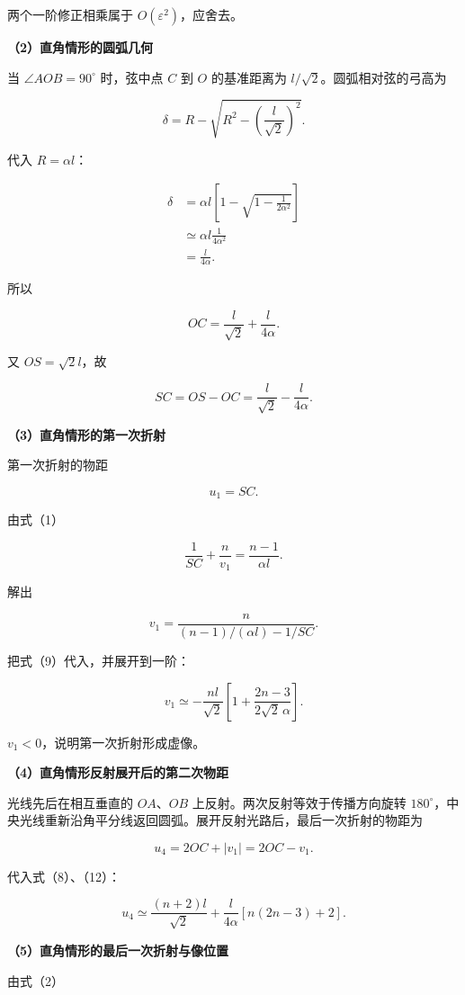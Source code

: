 \documentclass[12pt,a4paper,UTF8]{ctexart}
\begin{document}
两个一阶修正相乘属于 \(O(\varepsilon^2)\)，应舍去。

\textbf{（2）直角情形的圆弧几何}

当 \(\angle AOB=90^\circ\) 时，弦中点 \(C\) 到 \(O\) 的基准距离为
\(l/\sqrt2\)。圆弧相对弦的弓高为

\[
\delta
=R-\sqrt{R^2-\left(\frac l{\sqrt2}\right)^2}.
\tag{6}
\]

代入 \(R=\alpha l\)：

\[
\begin{aligned}
\delta
&=\alpha l
\left[
1-\sqrt{1-\frac1{2\alpha^2}}
\right]\\
&\simeq\alpha l\frac1{4\alpha^2}\\
&=\frac l{4\alpha}.
\end{aligned}
\tag{7}
\]

所以

\[
\boxed{
OC=\frac l{\sqrt2}+\frac l{4\alpha}
}.
\tag{8}
\]

又 \(OS=\sqrt2l\)，故

\[
\boxed{
SC=OS-OC
=\frac l{\sqrt2}-\frac l{4\alpha}
}.
\tag{9}
\]

\textbf{（3）直角情形的第一次折射}

第一次折射的物距

\[
u_1=SC.
\]

由式（1）

\[
\frac1{SC}+\frac n{v_1}
=\frac{n-1}{\alpha l}.
\tag{10}
\]

解出

\[
v_1
=\frac n{(n-1)/(\alpha l)-1/SC}.
\tag{11}
\]

把式（9）代入，并展开到一阶：

\[
\boxed{
v_1
\simeq
-\frac{nl}{\sqrt2}
\left[
1+\frac{2n-3}{2\sqrt2\,\alpha}
\right]
}.
\tag{12}
\]

\(v_1<0\)，说明第一次折射形成虚像。

\textbf{（4）直角情形反射展开后的第二次物距}

光线先后在相互垂直的 \(OA\)、\(OB\) 上反射。两次反射等效于传播方向旋转
\(180^\circ\)，中央光线重新沿角平分线返回圆弧。展开反射光路后，最后一次折射的物距为

\[
u_4=2OC+|v_1|=2OC-v_1.
\tag{13}
\]

代入式（8）、（12）：

\[
\boxed{
u_4
\simeq
\frac{(n+2)l}{\sqrt2}
+\frac l{4\alpha}
\left[n(2n-3)+2\right]
}.
\tag{14}
\]

\textbf{（5）直角情形的最后一次折射与像位置}

由式（2）
\end{document}
